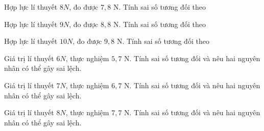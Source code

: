 \begin{ex}
Hợp lực lí thuyết $8N$, đo được $7,8$ N. Tính sai số tương đối theo %
\end{ex}

\begin{ex}
Hợp lực lí thuyết $9N$, đo được $8,8$ N. Tính sai số tương đối theo %
\end{ex}

\begin{ex}
Hợp lực lí thuyết $10N$, đo được $9,8$ N. Tính sai số tương đối theo %
\end{ex}

\begin{bt}
Giá trị lí thuyết $6N$, thực nghiệm $5,7$ N. Tính sai số tương đối và nêu hai nguyên nhân có thể gây sai lệch.
\end{bt}

\begin{bt}
Giá trị lí thuyết $7N$, thực nghiệm $6,7$ N. Tính sai số tương đối và nêu hai nguyên nhân có thể gây sai lệch.
\end{bt}

\begin{bt}
Giá trị lí thuyết $8N$, thực nghiệm $7,7$ N. Tính sai số tương đối và nêu hai nguyên nhân có thể gây sai lệch.
\end{bt}

